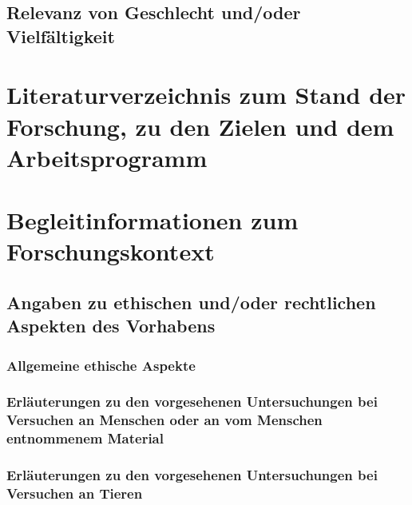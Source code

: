 \documentclass{scrartcl}
\begin{document}
\subsection{Relevanz von Geschlecht und/oder Vielfältigkeit}

\section{Literaturverzeichnis zum Stand der Forschung, zu den Zielen und dem Arbeitsprogramm}
\label{sec:bib}
\newrefcontext[labelprefix= ]
\printbibliography[notcategory=reviewed, notcategory=nonreviewed, notcategory=patents_pending, notcategory=patents, heading=none]

\clearpage

\setcounter{page}{1}
\renewcommand{\pagemark}{Seite \thepage~von max. 8}


\section{Begleitinformationen zum Forschungskontext}

\subsection{Angaben zu ethischen und/oder rechtlichen Aspekten des Vorhabens}

\subsubsection{Allgemeine ethische Aspekte}

\subsubsection{Erläuterungen zu den vorgesehenen Untersuchungen bei Versuchen an 
Menschen oder an vom Menschen entnommenem Material}

\subsubsection{Erläuterungen zu den vorgesehenen Untersuchungen bei Versuchen an Tieren}
\end{document}
